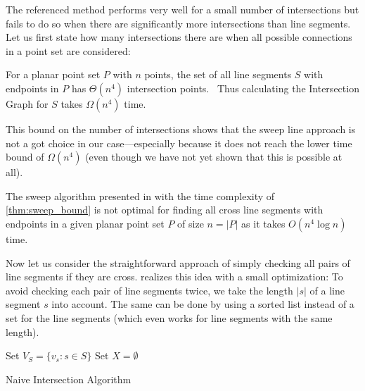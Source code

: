 The referenced method performs very well for a small number of
intersections but fails to do so when there are significantly more
intersections than line segments. Let us first state how many
intersections there are when all possible connections in a point set
are considered:

\begin{theorem}
  \label{thm:point_set_intersections}
  For a planar point set \(P\) with \(n\) points,
  the set of all line segments \(S\) with endpoints in \(P\)
  has \(\Theta(n^4)\) intersection points.~\cite{quadrilaterals_bound}
  Thus calculating the Intersection Graph for \(S\)
  takes \(\Omega(n^4)\) time.
\end{theorem}

This bound on the number of intersections shows that the sweep line
approach is not a got choice in our case---especially because it does
not reach the lower time bound of \(\Omega(n^4)\) (even though we have
not yet shown that this is possible at all).

\begin{theorem}
  The sweep algorithm presented in \cite[Section 2.1]{deberg_compgeom}
  with the time complexity of \cref{thm:sweep_bound}
  is not optimal for finding
  all \gls{cross} line segments with endpoints in a given
  planar point set \(P\) of size \(n=|P|\)
  as it takes \(O(n^4 \log n)\) time.
\end{theorem}

Now let us consider the straightforward approach of simply checking
all pairs of line segments if they are \gls{cross}. 
 realizes this idea with a small
optimization: To avoid checking each pair of line segments twice, we
take the length \(|s|\) of a line segment \(s\) into account. The same
can be done by using a sorted list instead of a set for the line
segments (which even works for line segments with the same length).

\begin{algorithm}
  \DontPrintSemicolon
  
  
  Set \(V_S = \{v_s : s \in S\} \) \;
  Set \(X = \emptyset\) \;
  \caption{\label{alg:naive_intersection}Naive Intersection Algorithm}
\end{algorithm}

